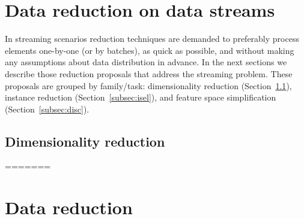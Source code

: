 \documentclass[preprint,12pt]{elsarticle}
\begin{document}
\section{Data reduction on data streams}
\label{sec:redstream}

In streaming scenarios reduction techniques are demanded to preferably process elements one-by-one (or by batches), as quick as possible, and without making any assumptions about data distribution in advance. In the next sections we describe those reduction proposals that address the streaming problem. These proposals are grouped by family/task: dimensionality reduction (Section~\ref{subsec:fsel}), instance reduction (Section~\ref{subsec:isel}), and feature space simplification (Section~\ref{subsec:disc}).


\subsection{Dimensionality reduction}
\label{subsec:fsel}
=======

\section{Data reduction}
\label{sec:datared}
\end{document}
